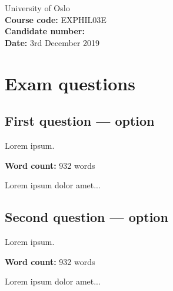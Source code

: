 \documentclass{article}
\begin{document}
	\begin{flushright}
		University of Oslo
		\\\textbf{Course code:} EXPHIL03E
		\\\textbf{Candidate number:} 
		\\\textbf{Date:} 3rd December 2019
	\end{flushright}

\section*{Exam questions}
	

\subsection*{First question ---  option}
	Lorem ipsum.

	\begin{flushright}
		\textbf{Word count:} 932 words
	\end{flushright}

	Lorem ipsum dolor amet...

\subsection*{Second question ---  option}
	Lorem ipsum.
	\begin{flushright}
		\textbf{Word count:} 932 words
	\end{flushright}
	
	Lorem ipsum dolor amet...
\end{document}
